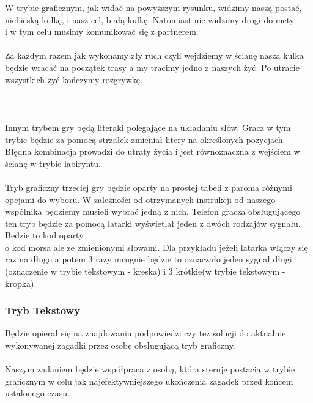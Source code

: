 W trybie graficznym, jak widać na powyższym rysunku, widzimy naszą postać, niebieską kulkę, i nasz cel, białą kulkę. Natomiast nie widzimy drogi do mety \\i w tym celu musimy komunikować się z partnerem.
\\
\\
Za każdym razem jak wykonamy zły ruch czyli wejdziemy w ścianę nasza kulka będzie wracać na początek trasy a my tracimy jedno z naszych żyć. Po utracie wszystkich żyć kończymy rozgrywkę.
\\
\\
\\
\\
Innym trybem gry będą literaki polegające na układaniu słów. Gracz w tym trybie będzie za pomocą strzałek zmieniał litery na określonych pozycjach. Błędna kombinacja prowadzi do utraty życia i jest równoznaczna z wejściem w ścianę w trybie labiryntu.
\\
\\
Tryb graficzny trzeciej gry będzie oparty na prostej tabeli z paroma różnymi opcjami do wyboru. W zależności od otrzymanych instrukcji od naszego wspólnika będziemy musieli wybrać jedną z nich. Telefon gracza obsługującego ten tryb będzie za pomocą latarki wyświetlał jeden z dwóch rodzajów sygnału. Bedzie to kod oparty \\ o kod morsa ale ze zmienionymi słowami. Dla przykładu jeżeli latarka włączy się raz na długo a potem 3 razy mrugnie będzie to oznaczało jeden sygnał długi (oznaczenie w trybie tekstowym - kreska) i 3 krótkie(w trybie tekstowym - kropka).

\subsubsection{Tryb Tekstowy}  %

\hspace{0.60cm}Będzie opierał się na znajdowaniu podpowiedzi czy też solucji do aktualnie wykonywanej zagadki przez osobę obsługującą tryb graficzny.
\\
\\
Naszym zadaniem będzie współpraca z osobą, która steruje postacią w trybie graficznym w celu jak najefektywniejszego ukończenia zagadek przed końcem ustalonego czasu.


